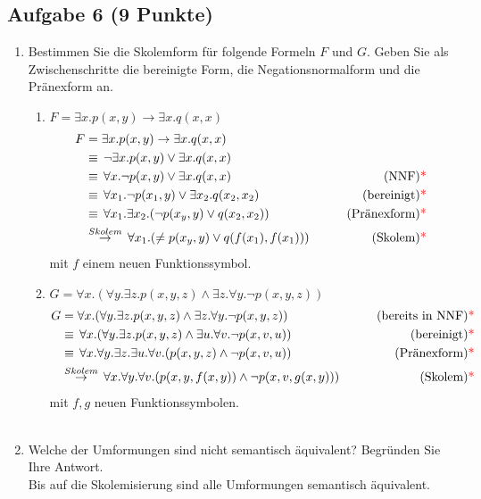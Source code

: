 \subsection*{Aufgabe 6 (9 Punkte)}
    \begin{enumerate}
        \item Bestimmen Sie die Skolemform für folgende Formeln $F$ und $G$.
        Geben Sie als Zwischenschritte die bereinigte Form, die Negationsnormalform und die Pränexform an.
        \begin{enumerate}[label=\roman*)]
            \item $F = \exists x.p(x,y) \to \exists x.q(x,x)$ \\
            \LOES
            \begin{align*}
            F &= \exists x.p(x,y) \to \exists x.q(x,x) \\
            &\equiv\, \neg \exists x.p(x,y) \lor \exists x.q(x,x) \\
            &\equiv\, \forall x.\neg p(x,y) \lor \exists x.q(x,x) \qquad &\text{(NNF){\textcolor{red}{* }}} \\
            &\equiv\, \forall x_1.\neg p(x_1,y) \lor \exists x_2.q(x_2,x_2) \qquad &\text{(bereinigt){\textcolor{red}{* }}} \\
            &\equiv\, \forall x_1.\exists x_2.(\neg p(x_y,y) \lor q(x_2,x_2)) \qquad &\text{(Pränexform){\textcolor{red}{* }}} \\
            &\stackrel{Skolem}{\rightarrow}\, \forall x_1.(\neq p(x_y, y) \lor q(f(x_1), f(x_1))) \qquad &\text{(Skolem){\textcolor{red}{* }}}
            \end{align*}
            mit $f$ einem neuen Funktionssymbol.

            \item $G = \forall x.(\forall y.\exists z.p(x,y,z) \land \exists z.\forall y.\neg p(x,y,z))$ \\
            \LOES
            \begin{align*}
            G &= \forall x.(\forall y.\exists z.p(x,y,z) \land \exists z.\forall y.\neg p(x,y,z)) \qquad &\text{(bereits in NNF){\textcolor{red}{* }}} \\
            &\equiv\, \forall x.(\forall y.\exists z.p(x,y,z) \land \exists u.\forall v.\neg p(x,v,u)) \qquad &\text{(bereinigt){\textcolor{red}{* }}} \\
            &\equiv\, \forall x.\forall y.\exists z.\exists u.\forall v.(p(x,y,z) \land \neg p(x,v,u)) \qquad &\text{(Pränexform){\textcolor{red}{* }}} \\
            &\stackrel{Skolem}{\rightarrow}\, \forall x.\forall y.\forall v.(p(x,y,f(x,y)) \land \neg p(x,v,g(x,y))) \qquad &\text{(Skolem){\textcolor{red}{* }}}
            \end{align*}
            mit $f,g$ neuen Funktionssymbolen.\\\\
        \end{enumerate}
        \item Welche der Umformungen sind nicht semantisch äquivalent? Begründen Sie Ihre Antwort. \\
        \LOES Bis auf die Skolemisierung sind alle Umformungen semantisch äquivalent.\POINT
    \end{enumerate}

